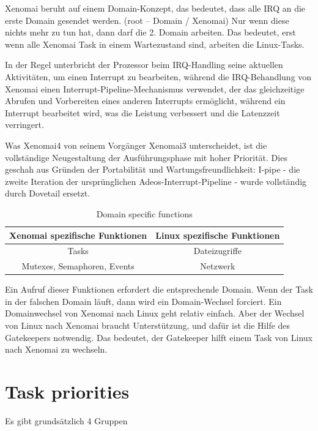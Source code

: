 \documentclass[MMR,Master,english]{twbook}
\begin{document}
\noindent Xenomai beruht auf einem Domain-Konzept, das bedeutet, dass alle IRQ an die erste Domain gesendet werden. (root – Domain / Xenomai)
Nur wenn diese nichts mehr zu tun hat, dann darf die 2. Domain arbeiten.
Das bedeutet, erst wenn alle Xenomai Task in einem Wartezustand sind, arbeiten die Linux-Tasks.

\noindent In der Regel unterbricht der Prozessor beim IRQ-Handling seine aktuellen Aktivitäten, um einen Interrupt zu bearbeiten, während die IRQ-Behandlung von Xenomai einen Interrupt-Pipeline-Mechanismus verwendet, der das gleichzeitige Abrufen und Vorbereiten eines anderen Interrupts ermöglicht, während ein Interrupt bearbeitet wird, was die Leistung verbessert und die Latenzzeit verringert.

\noindent Was Xenomai4 von seinem Vorgänger Xenomai3 unterscheidet, ist die vollständige Neugestaltung der Ausführungsphase mit hoher Priorität. Dies geschah aus Gründen der Portabilität und Wartungsfreundlichkeit: I-pipe - die zweite Iteration der ursprünglichen Adeos-Interrupt-Pipeline - wurde vollständig durch Dovetail ersetzt.

\begin{table}[H]
	\centering
	\caption[Domain specific functions]{Domain specific functions}
	\label{tab:domain_specific_functions}
	\begin{tabular}{|c|c|}
		\hline
		\textbf{Xenomai spezifische Funktionen} & \textbf{Linux spezifische Funktionen} \\ \hline
		Tasks                                   & Dateizugriffe                         \\ \hline
		Mutexes, Semaphoren, Events             & Netzwerk                              \\ \hline
	\end{tabular}
\end{table}


\noindent Ein Aufruf dieser Funktionen erfordert die entsprechende Domain. Wenn der Task in der falschen Domain läuft, dann wird ein Domain-Wechsel forciert.
Ein Domainwechsel von Xenomai nach Linux geht relativ einfach. Aber der Wechsel von Linux nach Xenomai braucht Unterstützung, und dafür ist die Hilfe des Gatekeepers notwendig. Das bedeutet, der Gatekeeper hilft einem Task von Linux nach Xenomai zu wechseln.

\clearpage
\section{Task priorities}
Es gibt grundsätzlich 4 Gruppen
\end{document}
